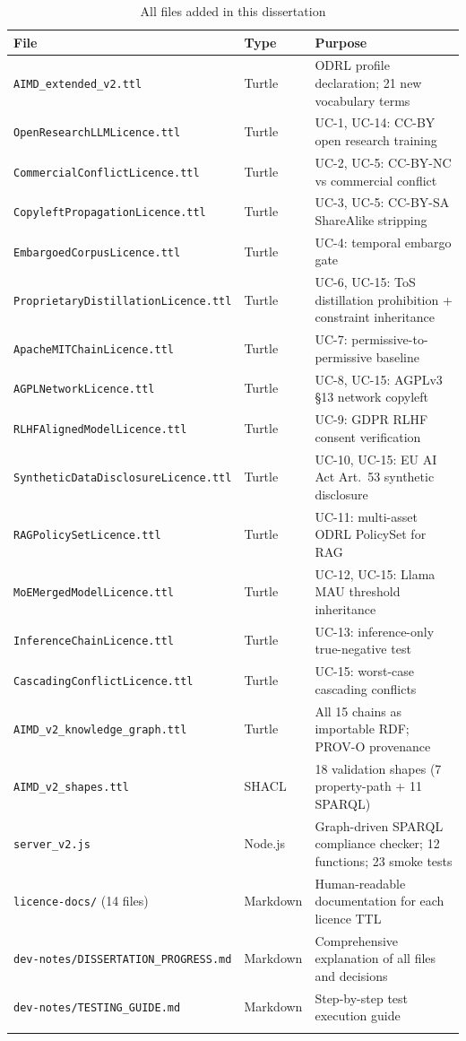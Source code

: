 \documentclass[12pt,a4paper]{article}
\begin{document}
\begin{longtable}{@{}p{6.5cm}p{1.8cm}p{5.7cm}@{}}
\footnotesize
\toprule
\textbf{File} & \textbf{Type} & \textbf{Purpose} \\
\midrule
\endhead
\texttt{AIMD\_extended\_v2.ttl} & Turtle & ODRL profile declaration; 21 new vocabulary terms \\
\texttt{OpenResearchLLMLicence.ttl} & Turtle & UC-1, UC-14: CC-BY open research training \\
\texttt{CommercialConflictLicence.ttl} & Turtle & UC-2, UC-5: CC-BY-NC vs commercial conflict \\
\texttt{CopyleftPropagationLicence.ttl} & Turtle & UC-3, UC-5: CC-BY-SA ShareAlike stripping \\
\texttt{EmbargoedCorpusLicence.ttl} & Turtle & UC-4: temporal embargo gate \\
\texttt{ProprietaryDistillationLicence.ttl} & Turtle & UC-6, UC-15: ToS distillation prohibition + constraint inheritance \\
\texttt{ApacheMITChainLicence.ttl} & Turtle & UC-7: permissive-to-permissive baseline \\
\texttt{AGPLNetworkLicence.ttl} & Turtle & UC-8, UC-15: AGPLv3 \S 13 network copyleft \\
\texttt{RLHFAlignedModelLicence.ttl} & Turtle & UC-9: GDPR RLHF consent verification \\
\texttt{SyntheticDataDisclosureLicence.ttl} & Turtle & UC-10, UC-15: EU AI Act Art.\ 53 synthetic disclosure \\
\texttt{RAGPolicySetLicence.ttl} & Turtle & UC-11: multi-asset ODRL PolicySet for RAG \\
\texttt{MoEMergedModelLicence.ttl} & Turtle & UC-12, UC-15: Llama MAU threshold inheritance \\
\texttt{InferenceChainLicence.ttl} & Turtle & UC-13: inference-only true-negative test \\
\texttt{CascadingConflictLicence.ttl} & Turtle & UC-15: worst-case cascading conflicts \\
\texttt{AIMD\_v2\_knowledge\_graph.ttl} & Turtle & All 15 chains as importable RDF; PROV-O provenance \\
\texttt{AIMD\_v2\_shapes.ttl} & SHACL & 18 validation shapes (7 property-path + 11 SPARQL) \\
\texttt{server\_v2.js} & Node.js & Graph-driven SPARQL compliance checker; 12 functions; 23 smoke tests \\
\texttt{licence-docs/} (14 files) & Markdown & Human-readable documentation for each licence TTL \\
\texttt{dev-notes/DISSERTATION\_PROGRESS.md} & Markdown & Comprehensive explanation of all files and decisions \\
\texttt{dev-notes/TESTING\_GUIDE.md} & Markdown & Step-by-step test execution guide \\
\bottomrule
\caption{All files added in this dissertation}
\end{longtable}
\end{document}
